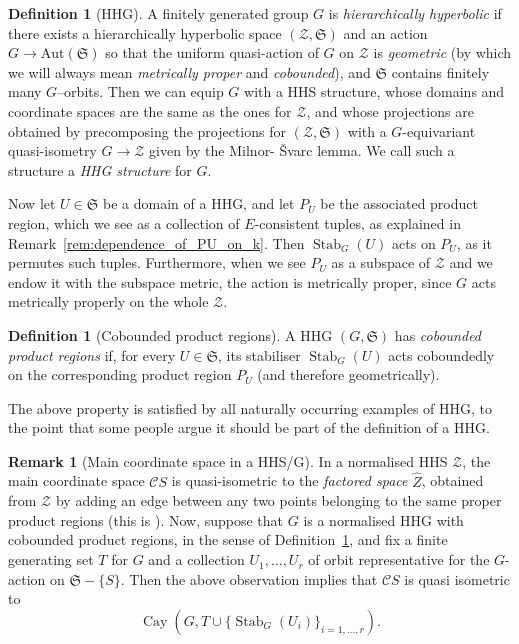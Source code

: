 \documentclass[svgnames]{amsart}
\theoremstyle{plain}
\theoremstyle{definition}
\newtheorem{defn}[thm]{Definition}
\newtheorem{rem}[thm]{Remark}
\newcommand{\Cay}[2]{\operatorname{Cay}\left(#1,#2\right)}
\newcommand{\frakS}{\mathfrak S}
\newcommand{\C}{\mathcal C}
\newcommand{\cuco}[1]{{\mathcal #1}}
\newcommand{\Stab}[2]{\operatorname{Stab}_{#1}(#2)}
\newcommand{\h}{\widehat}
\begin{document}
\begin{defn}[HHG]\label{defn:HHG}
A finitely generated group $G$ is \emph{hierarchically hyperbolic} if there exists a hierarchically hyperbolic space $({\cuco Z},\frakS)$ and an action $G\rightarrow\text{Aut}(\frakS)$ so that the uniform quasi-action of $G$ on ${\cuco Z}$ is \emph{geometric} (by which we will always mean \emph{metrically proper} and \emph{cobounded}), and $\frakS$ contains finitely many $G$--orbits. Then we can equip $G$ with a HHS structure, whose domains and coordinate spaces are the same as the ones for ${\cuco Z}$, and whose projections are obtained by precomposing the projections for $({\cuco Z},\frakS)$ with a $G$-equivariant quasi-isometry $G\to {\cuco Z}$ given by the Milnor- \v{S}varc lemma. We call such a structure a \emph{HHG structure} for $G$.
\end{defn}



Now let $U\in \frakS$ be a domain of a HHG, and let $P_U$ be the associated product region, which we see as a collection of $E$-consistent tuples, as explained in Remark~\ref{rem:dependence_of_PU_on_k}. Then $\Stab{G}{U}$ acts on $P_U$, as it permutes such tuples. Furthermore, when we see $P_U$ as a subspace of $\cuco Z$ and we endow it with the subspace metric, the action is metrically proper, since $G$ acts metrically properly on the whole $\cuco Z$.

\begin{defn}[Cobounded product regions]\label{defn:cobounded_stab}
    A HHG $(G,\frakS)$ has \emph{cobounded product regions} if, for every $U\in \frakS$, its stabiliser $\Stab{G}{U}$ acts coboundedly on the corresponding product region $P_{U}$ (and therefore geometrically).
\end{defn}
The above property is satisfied by all naturally occurring examples of HHG, to the point that some people argue it should be part of the definition of a HHG.


\begin{rem}[Main coordinate space in a HHS/G]\label{rem:top_guy_HHG}
    In a normalised HHS $\cuco Z$, the main coordinate space $\C S$ is quasi-isometric to the \emph{factored space} $\h{Z}$, obtained from $\cuco Z$ by adding an edge between any two points belonging to the same proper product regions (this is \cite[Corollary 2.9]{hhs_asdim}). Now, suppose that $G$ is a normalised HHG with cobounded product regions, in the sense of Definition~\ref{defn:cobounded_stab}, and fix a finite generating set $T$ for $G$ and a collection $U_1,\ldots, U_r$ of orbit representative for the $G$-action on $\frakS-\{S\}$. Then the above observation implies that $\C S$ is quasi isometric to 
    $$\Cay{G}{T\cup \{\Stab{G}{U_i}\}_{i=1,\ldots, r}}.$$
\end{rem}
\end{document}
